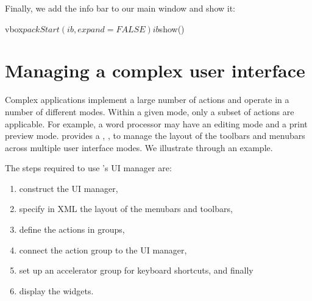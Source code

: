 Finally, we add the info bar to our main window and show it:
\begin{Schunk}
\begin{Sinput}
 vbox$packStart(ib, expand = FALSE)
 ib$show()
\end{Sinput}
\end{Schunk}

\section{Managing a complex user interface}
\label{sec:RGtk2:UIManager}

Complex applications implement a large number of actions and operate
in a number of different modes. Within a given mode, only a subset of
actions are applicable. For example, a word processor may have an
editing mode and a print preview mode. \GTK\/ provides a , , to manage the layout of
the toolbars and menubars across multiple user interface modes. We
illustrate through an example.

The steps required to use \GTK's UI manager are:
\begin{enumerate}
\item construct the UI manager,
\item specify in XML the layout of the menubars and toolbars,
\item define the actions in groups,
\item connect the action group to the UI manager, 
\item set up an accelerator group for keyboard shortcuts, 
and finally
\item display the widgets.
\end{enumerate}

